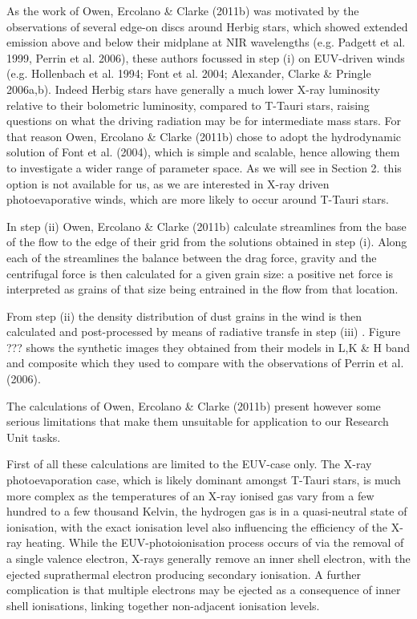 \documentclass[10pt,fleqn,twoside]{article}
\makeatletter
\renewcommand\paragraph{\@startsection{paragraph}{4}{\z@}%
            {-2.5ex\@plus -1ex \@minus -.25ex}%
            {1.25ex \@plus .25ex}%
            {\normalfont\normalsize\bfseries}}
\makeatother
\begin{document}
As the work of Owen, Ercolano \& Clarke (2011b) was motivated by the
observations of several edge-on discs around Herbig stars, which
showed extended emission above and below their midplane at NIR
wavelengths (e.g. Padgett et al. 1999, Perrin et al. 2006), these
authors focussed in step (i)  on EUV-driven winds (e.g. Hollenbach et al. 1994;
Font et al. 2004; Alexander, Clarke \& Pringle 2006a,b). Indeed Herbig
stars have generally a much lower X-ray luminosity relative to their
bolometric luminosity, compared to T-Tauri stars, raising questions on
what the driving radiation may be for intermediate mass stars. For
that reason Owen, Ercolano \& Clarke (2011b) chose to adopt the
hydrodynamic solution of Font et al. (2004), which is simple and
scalable, hence allowing them to investigate a wider range of
parameter space. As we will see in Section 2. this option is not
available for us, as we are interested in X-ray driven
photoevaporative winds, which are more likely to occur around T-Tauri
stars. 

In step (ii) Owen, Ercolano \& Clarke (2011b) calculate streamlines
from the base of the flow to the edge of their grid from the solutions
obtained in step (i). Along each of the streamlines the balance
between the drag force, gravity and the centrifugal force is then
calculated for a given grain size: a positive net force is interpreted
as grains of that size being entrained in the flow from that
location. 

From step (ii) the density distribution of dust grains in the wind is
then calculated and post-processed by means of radiative
transfe in step (iii) . Figure ??? shows the synthetic images they obtained from
their models in L,K \& H band and composite which they used to compare
with the observations of Perrin et al. (2006). 


The calculations of Owen, Ercolano \& Clarke (2011b) present however
some serious limitations that make them unsuitable for application to our Research
Unit tasks. 

First of all these calculations are limited to the EUV-case only. The
X-ray photoevaporation case, which is likely dominant amongst T-Tauri
stars, is much more complex as the temperatures
of an X-ray ionised gas vary from a few hundred to a few thousand
Kelvin, the hydrogen gas is in a quasi-neutral state of ionisation, with the
exact ionisation level also influencing the efficiency of the X-ray
heating. While the EUV-photoionisation process occurs of via the removal
of a single valence electron, X-rays generally remove an inner shell
electron, with the ejected suprathermal electron producing secondary
ionisation. A further complication is that multiple electrons may be
ejected as a consequence of inner shell ionisations, linking together
non-adjacent ionisation levels.
\end{document}
